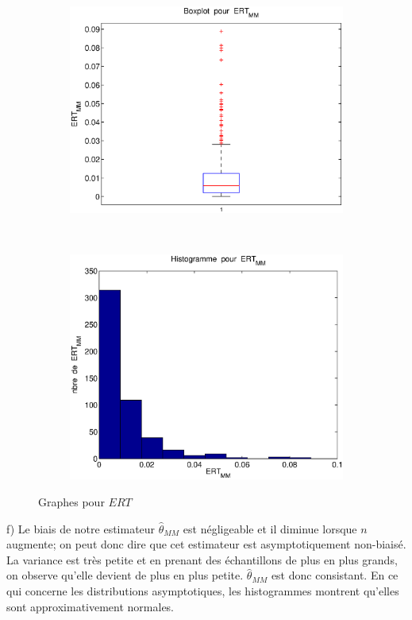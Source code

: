 \begin{figure}[!ht]
        \centering
        \begin{subfigure}[b]{0.4\textwidth}
                \includegraphics[width=\textwidth]{graphes/boxplot_ertmm.eps}
        \end{subfigure}%
        ~ 
        \begin{subfigure}[b]{0.4\textwidth}
                \includegraphics[width=\textwidth]{graphes/hist_ertmm.eps}
        \end{subfigure}
        \caption{Graphes pour $ERT$}\label{fig:ertmm}
\end{figure}

f) Le biais de notre estimateur $\hat\theta_{MM}$ est négligeable et il diminue lorsque $n$ augmente; on peut donc dire que cet estimateur est asymptotiquement non-biaisé. La variance est très petite et en prenant des échantillons de plus en plus grands, on observe qu'elle devient de plus en plus petite. $\hat\theta_{MM}$ est donc consistant. En ce qui concerne les distributions asymptotiques, les histogrammes montrent qu’elles sont approximativement normales.